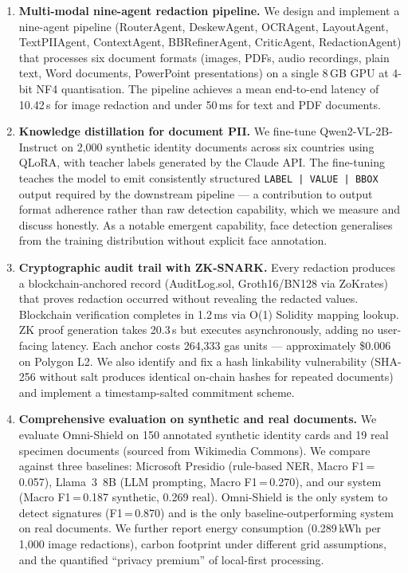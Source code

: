\begin{enumerate}

  \item \textbf{Multi-modal nine-agent redaction pipeline.}
  We design and implement a nine-agent pipeline
  (RouterAgent, DeskewAgent, OCRAgent, LayoutAgent,
  TextPIIAgent, ContextAgent, BBRefinerAgent,
  CriticAgent, RedactionAgent) that processes six
  document formats (images, PDFs, audio recordings,
  plain text, Word documents, PowerPoint presentations)
  on a single 8\,GB GPU at 4-bit NF4 quantisation.
  The pipeline achieves a mean end-to-end latency of
  10.42\,s for image redaction and under 50\,ms for
  text and PDF documents.

  \item \textbf{Knowledge distillation for document PII.}
  We fine-tune Qwen2-VL-2B-Instruct on 2,000 synthetic
  identity documents across six countries using QLoRA,
  with teacher labels generated by the Claude API.
  The fine-tuning teaches the model to emit consistently
  structured \texttt{LABEL\,|\,VALUE\,|\,BBOX} output
  required by the downstream pipeline --- a contribution
  to output format adherence rather than raw detection
  capability, which we measure and discuss honestly.
  As a notable emergent capability, face detection
  generalises from the training distribution without
  explicit face annotation.

  \item \textbf{Cryptographic audit trail with ZK-SNARK.}
  Every redaction produces a blockchain-anchored record
  (AuditLog.sol, Groth16/BN128 via ZoKrates) that proves
  redaction occurred without revealing the redacted values.
  Blockchain verification completes in 1.2\,ms via O(1)
  Solidity mapping lookup.
  ZK proof generation takes 20.3\,s but executes
  asynchronously, adding no user-facing latency.
  Each anchor costs 264,333 gas units --- approximately
  \$0.006 on Polygon L2.
  We also identify and fix a hash linkability
  vulnerability (SHA-256 without salt produces
  identical on-chain hashes for repeated documents)
  and implement a timestamp-salted commitment scheme.

  \item \textbf{Comprehensive evaluation on synthetic
  and real documents.}
  We evaluate Omni-Shield on 150 annotated synthetic
  identity cards and 19 real specimen documents
  (sourced from Wikimedia Commons).
  We compare against three baselines: Microsoft Presidio
  (rule-based NER, Macro F1\,=\,0.057), Llama~3~8B
  (LLM prompting, Macro F1\,=\,0.270), and our system
  (Macro F1\,=\,0.187 synthetic, 0.269 real).
  Omni-Shield is the only system to detect signatures
  (F1\,=\,0.870) and is the only baseline-outperforming
  system on real documents.
  We further report energy consumption
  (0.289\,kWh per 1,000 image redactions), carbon
  footprint under different grid assumptions, and
  the quantified ``privacy premium'' of local-first
  processing.

\end{enumerate}

